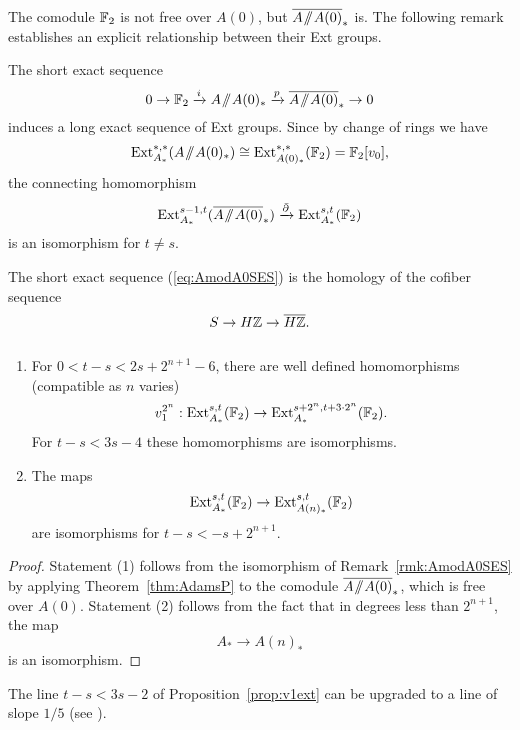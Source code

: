 The comodule $\mathbb{F}_2$ is not free over $A(0)$, but $\overline{A\! \sslash \! A(0)}_*$ is. The following remark establishes an explicit relationship between their Ext groups.
\begin{rmk}\label{rmk:AmodA0SES}
The short exact sequence
\begin{equation}\label{eq:AmodA0SES}
 0 \rightarrow \FF_2 \xrightarrow{i} A\mmod A(0)_* \xrightarrow{p} \AA0 \rightarrow 0
\end{equation}
induces a long exact sequence of Ext groups.  Since by change of rings we have
\[ \operatorname{Ext}^{*,*}_{A_*}(A \! \sslash \! A(0)_*) \cong \operatorname{Ext}^{*,*}_{A(0)_*}(\mathbb{F}_2) = \mathbb{F}_2[v_0], \]
the connecting homomorphism
\[ \Ext^{s-1,t}_{A_*}(\AA0) \xrightarrow{\bar{\partial}} \Ext_{A_*}^{s,t}(\FF_2) \]
is an isomorphism for $t \ne s$.  

The short exact sequence (\ref{eq:AmodA0SES}) is the homology of the cofiber sequence
$$ S \rightarrow H\mathbb{Z} \rightarrow \overline{H\mathbb{Z}}. $$ 
\end{rmk}




\begin{prop}\label{prop:v1ext}
$\quad$
\begin{enumerate} 
\item For $ 0 < t -s < 2s+2^{n+1}-6 $,
there are well defined homomorphisms (compatible as $n$ varies)
\[
v_1^{2^n}: \operatorname{Ext}^{s,t}_{A_*}(\mathbb{F}_2) \rightarrow \operatorname{Ext}^{s+2^n,t+3\cdot 2^n}_{A_*}(\mathbb{F}_2). 
\]
For $t -s < 3s-4$
these homomorphisms are isomorphisms.

\item The maps
$$ \operatorname{Ext}^{s,t}_{A_*}(\mathbb{F}_2) \rightarrow \operatorname{Ext}^{s,t}_{A(n)_*}(\mathbb{F}_2) $$
are isomorphisms for $t-s < -s+2^{n+1}$.
\end{enumerate}
\end{prop}  

\begin{proof}
Statement (1) follows from the isomorphism of Remark~\ref{rmk:AmodA0SES} by applying Theorem~\ref{thm:AdamsP} to the comodule $\overline{A\! \sslash \! A(0)}_*$, which is free over $A(0)$. Statement (2) follows from the fact that in degrees less than $2^{n+1}$, the map
$$ A_* \rightarrow A(n)_* $$
is an isomorphism.
\end{proof}

\begin{rmk}\label{rmk:onefifth}
The line $t -s < 3s-2$ of Proposition~\ref{prop:v1ext} can be upgraded to a line of slope $1/5$ (see \cite[Thm~3.4.6]{Ravenel}).
\end{rmk}

